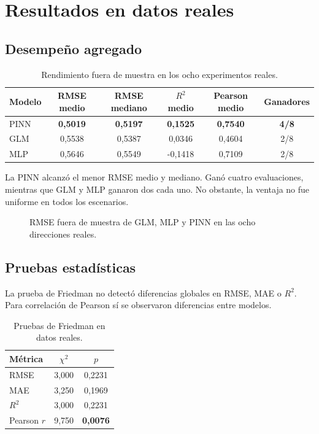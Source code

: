 \section{Resultados en datos reales}

\subsection{Desempeño agregado}

\begin{table}[H]
\centering
\caption{Rendimiento fuera de muestra en los ocho experimentos reales.}
\label{tab:real_performance}
\begin{tabular}{lccccc}
\toprule
Modelo & RMSE medio & RMSE mediano & $R^2$ medio & Pearson medio & Ganadores \\
\midrule
PINN & \textbf{0,5019} & \textbf{0,5197} & \textbf{0,1525} & \textbf{0,7540} & \textbf{4/8} \\
GLM  & 0,5538 & 0,5387 & 0,0346 & 0,4604 & 2/8 \\
MLP  & 0,5646 & 0,5549 & -0,1418 & 0,7109 & 2/8 \\
\bottomrule
\end{tabular}
\end{table}

La PINN alcanzó el menor RMSE medio y mediano. Ganó cuatro evaluaciones, mientras que GLM y MLP ganaron dos cada uno. No obstante, la ventaja no fue uniforme en todos los escenarios.

\begin{figure}[H]
\centering
{}
\caption{RMSE fuera de muestra de GLM, MLP y PINN en las ocho direcciones reales.}
\label{fig:real_rmse_experiments}
\end{figure}

\subsection{Pruebas estadísticas}

La prueba de Friedman no detectó diferencias globales en RMSE, MAE o $R^2$. Para correlación de Pearson sí se observaron diferencias entre modelos.

\begin{table}[H]
\centering
\caption{Pruebas de Friedman en datos reales.}
\label{tab:real_friedman}
\begin{tabular}{lcc}
\toprule
Métrica & $\chi^2$ & $p$ \\
\midrule
RMSE & 3,000 & 0,2231 \\
MAE & 3,250 & 0,1969 \\
$R^2$ & 3,000 & 0,2231 \\
Pearson $r$ & 9,750 & \textbf{0,0076} \\
\bottomrule
\end{tabular}
\end{table}

